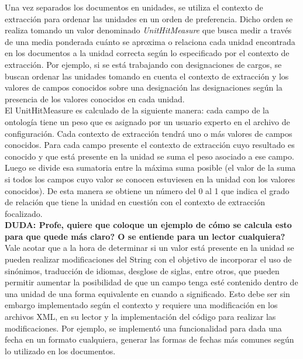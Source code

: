 Una vez separados los documentos en unidades, se utiliza el contexto de extracción para ordenar las unidades en un orden de preferencia. Dicho orden se realiza tomando un valor denominado \emph{UnitHitMeasure} que busca medir a través de una media ponderada cuánto se aproxima o relaciona cada unidad encontrada en los documentos a la unidad correcta según lo especificado por el contexto de extracción. Por ejemplo, si se está trabajando con designaciones de cargos, se buscan ordenar las unidades tomando en cuenta el contexto de extracción y los valores de campos conocidos sobre una designación las designaciones según la presencia de los valores conocidos en cada unidad.\\

El UnitHitMeasure es calculado de la siguiente manera: cada campo de la ontología tiene un peso que es asignado por un usuario experto en el archivo de configuración. Cada contexto de extracción tendrá uno o más valores de campos conocidos. Para cada campo presente el contexto de extracción cuyo resultado es conocido y que está presente en la unidad se suma el peso asociado a ese campo. Luego se divide esa sumatoria entre la máxima suma posible (el valor de la suma si todos los campos cuyo valor se conocen estuviesen en la unidad con los valores conocidos). De esta manera se obtiene un número del 0 al 1 que indica el grado de relación que tiene la unidad en cuestión con el contexto de extracción focalizado.\\

\textbf{DUDA: Profe, quiere que coloque un ejemplo de cómo se calcula esto para que quede más claro? O se entiende para un lector cualquiera?}\\

Vale acotar que a la hora de determinar si un valor está presente en la unidad se pueden realizar modificaciones del String con el objetivo de incorporar el uso de sinónimos, traducción de idiomas, desglose de siglas, entre otros, que pueden permitir aumentar la posibilidad de que un campo tenga esté contenido dentro de una unidad de una forma equivalente en cuando a significado. Esto debe ser sin embargo implementado según el contexto y requiere una modificación en los archivos XML, en su lector y la implementación del código para realizar las modificaciones. Por ejemplo, se implementó una funcionalidad para dada una fecha en un formato cualquiera, generar las formas de fechas más comunes según lo utilizado en los documentos. \\

